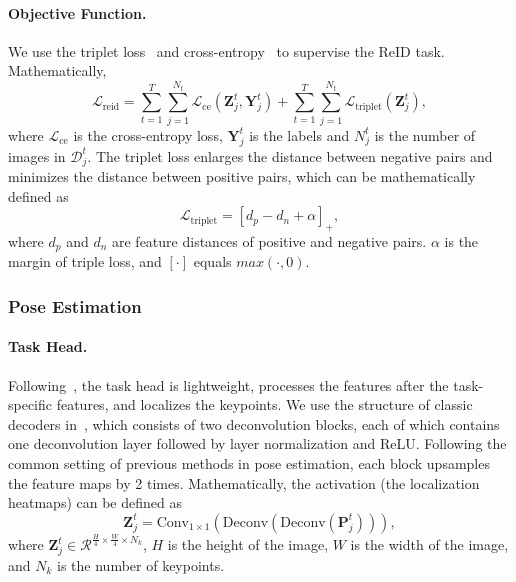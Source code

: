 \documentclass[10pt,twocolumn,letterpaper]{article}
\begin{document}
\paragraph{Objective Function.} We use the triplet loss~\cite{hermans2017defense} and cross-entropy~\cite{zhang2018generalized} to supervise the ReID task. Mathematically,
\begin{equation}
    \mathcal{L}_{\text{reid}} = \sum_{t=1}^T\sum_{j=1}^{N_t} \mathcal{L}_{\text{ce}}(\mathbf{Z}^t_j, \mathbf{Y}^t_j) + \sum_{t=1}^T\sum_{j=1}^{N_t} \mathcal{L}_{\text{triplet}}(\mathbf{Z}^t_j),
\end{equation}
where $\mathcal{L}_{\text{ce}}$ is the cross-entropy loss, $\mathbf{Y}^t_j$ is the labels and $N^t_j$ is the number of images in $\mathcal{D}^t_j$. The triplet loss enlarges the distance between negative pairs and minimizes the distance between positive pairs, which can be mathematically defined as 
\begin{equation}
    \mathcal{L}_{\text{triplet}} = [d_p - d_n + \alpha]_{+},
\end{equation}
where $d_p$ and $d_n$ are feature distances of positive and negative pairs. $\alpha$ is the margin of triple loss, and $[\cdot]$ equals $max(\cdot, 0)$.

\subsubsection{Pose Estimation}
\paragraph{Task Head.} Following~\cite{xu2022vitpose}, the task head is lightweight, processes the features after the task-specific features, and localizes the keypoints. We use the structure of classic decoders in~\cite{xu2022vitpose}, which consists of two deconvolution blocks, each of which contains one deconvolution layer followed by layer normalization and ReLU. Following the common setting of previous methods in pose estimation, each block upsamples the feature maps by 2 times. Mathematically, the activation (the localization heatmaps) can be defined as
\begin{equation}
    \mathbf{Z}^t_j = \text{Conv}_{1\times1}(\text{Deconv}(\text{Deconv}(\mathbf{P}^t_j))),
\end{equation}
where $\mathbf{Z}^t_j \in \mathcal{R}^{\frac{H}{4}\times \frac{W}{4} \times N_k}$, $H$ is the height of the image, $W$ is the width of the image, and $N_k$ is the number of keypoints.
\end{document}
